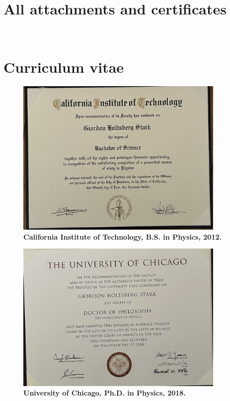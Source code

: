 


\setcounter{chapter}{8}
\chapter{All attachments and certificates}
\, \\

\begingroup
\let\clearpage\relax
\tableofcontents
\endgroup

\clearpage

\setcounter{chapter}{1}
\chapter{Curriculum vitae}
\begin{figure}[h!]
	\centering
	\caption{\textbf{California Institute of Technology, B.S. in Physics, 2012.}}
	\includegraphics[width=0.9\textwidth]{attachments/B-CV/BS}
\end{figure}

\begin{figure}[h!]
	\centering
	\caption{\textbf{University of Chicago, Ph.D. in Physics, 2018.}}
	\includegraphics[width=0.9\textwidth]{attachments/B-CV/PhD}
\end{figure}

